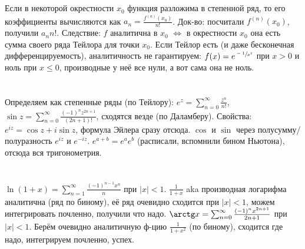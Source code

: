 \section{} %
Если в некоторой окрестности $x_0$ функция разложима в степенной ряд, то его коэффициенты вычисляются как $a_n=\frac{f^{(n)}(x_0)}{n!}$.
Док-во: посчитали $f^{(n)}(x_0)$, получили $a_nn!$.
Следствие: $f$ аналитична в $x_0$ $\iff$ в окрестности $x_0$ она есть сумма своего ряда Тейлора для точки $x_0$.
Если Тейлор есть (и даже бесконечная дифференцируемость), аналитичность не гарантируем: $f(x)=e^{\sfrac{-1}{x^2}}$ при $x>0$ и ноль при $x \le 0$, производные у неё все нули, а вот сама она не ноль.

\section{} %
Определяем как степенные ряды (по Тейлору): $e^z = \sum_{n=0}^\infty \frac{z^n}{n!}$,
$\sin z = \sum_{n=0}^\infty \frac{(-1)^nz^{2n+1}}{(2n+1)!}$, сходятся везде (по Даламберу).
Свойства: $e^{iz}=\cos z + i \sin z$, формула Эйлера сразу отсюда.
$\cos$ и $\sin$ через полусумму/полуразность $e^{iz}$ и $e^{-iz}$.
$e^{a+b}=e^ae^b$ (расписали, вспомнили бином Ньютона), отсюда вся тригонометрия.

\section{} %
$\ln(1+x)=\sum_{n=1}^\infty \frac{(-1)^{n-1}x^n}{n}$ при $|x|<1$.
$\frac{1}{1+x}$ aka производная логарифма аналитична (ряд по биному),
её ряд очевидно сходится при $|x|<1$, можем интегрировать почленно, получили что надо.
$\arctg x = \sum_{n=0}^\infty \frac{(-1)^nx^{2n+1}}{2n+1}$ при $|x|<1$.
Берём очевидно аналитичную ф-цию $\frac{1}{1+x^2}$ (по биному), сходится где надо,
интегрируем почленно, успех.

\section{} %
\TODO

